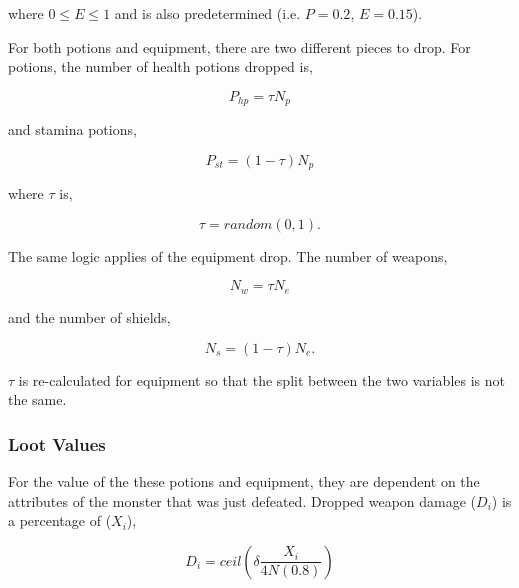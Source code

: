 where $0 \leq E \leq 1$ and is also predetermined (i.e. $P=0.2$, $E=0.15$). 


\noindent For both potions and equipment, there are two different pieces to drop. For potions, the number of health potions dropped is,

\begin{equation}
    P_{hp} = \tau N_p
\end{equation}

and stamina potions,

\begin{equation}
    P_{st} = (1-\tau) N_p
\end{equation}

where $\tau$ is,

\begin{equation}
    \tau = random(0,1).
\end{equation}

\noindent The same logic applies of the equipment drop. The number of weapons,

\begin{equation}
    N_w = \tau N_e
\end{equation}

and the number of shields,

\begin{equation}
    N_s = (1 - \tau) N_e. 
\end{equation}

$\tau$ is re-calculated for equipment so that the split between the two variables is not the same. 


\subsubsection{Loot Values}

For the value of the these potions and equipment, they are dependent on the attributes of the monster that was just defeated. Dropped weapon damage ($D_i$) is a percentage of ($X_i$),

\begin{equation}
    D_i = ceil\left (\delta \frac{X_i}{4N(0.8)} \right)
\end{equation}

